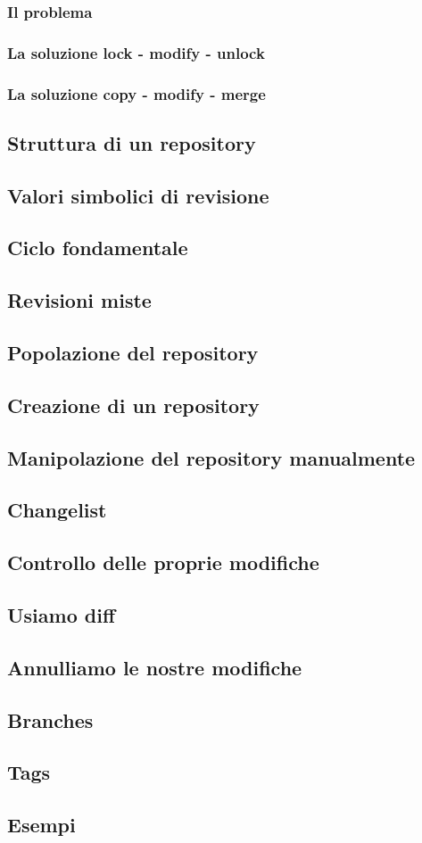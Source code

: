 \subsubsection{Il problema}
\subsubsection{La soluzione lock - modify - unlock}
\subsubsection{La soluzione copy - modify - merge}
\subsection{Struttura di un repository}
\subsection{Valori simbolici di revisione}
\subsection{Ciclo fondamentale}
\subsection{Revisioni miste}
\subsection{Popolazione del repository}
\subsection{Creazione di un repository}
\subsection{Manipolazione del repository manualmente}
\subsection{Changelist}
\subsection{Controllo delle proprie modifiche}
\subsection{Usiamo diff}
\subsection{Annulliamo le nostre modifiche}
\subsection{Branches}
\subsection{Tags}
\subsection{Esempi}

